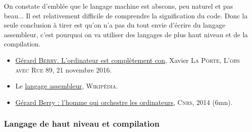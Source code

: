 On constate d'emblée que le langage machine est abscons, peu naturel et pas beau... Il est relativement difficile de comprendre la signification du code. Donc la seule conclusion à tirer est qu'on n'a pas du tout envie d'écrire du langage assembleur, c'est pourquoi on va utiliser des langages de plus haut niveau et de la compilation. 

\begin{gofurther}
\begin{itemize}\jazzitem
\item \href{https://www.nouvelobs.com/rue89/rue89-le-grand-entretien/20160826.RUE7684/gerard-berry-l-ordinateur-est-completement-con.html}{Gérard \textsc{Berry}. L'ordinateur est complètement con}, Xavier \textsc{La Porte}, \textsc{L'obs avec Rue 89}, 21 novembre 2016.
\item Le \href{https://fr.wikipedia.org/wiki/Assembleur}{langage assembleur}, \textsc{Wikipédia}.
\end{itemize}

\vspace{2pt}
\begin{itemize}\jazzitem
\item \href{https://videotheque.cnrs.fr/visio=4419}{Gérard Berry : l'homme qui orchestre les ordinateurs}, \textsc{Cnrs}, 2014 (6mn).
\end{itemize}
\end{gofurther}

\vspace{6pt}


\subsubsection[Langage de haut niveau et compilation]{Langage de haut niveau et compilation}
\label{subsub:VI.2.1.2}


